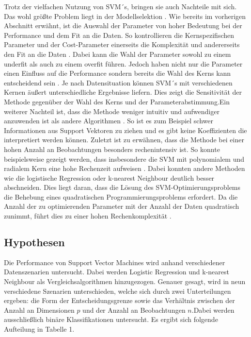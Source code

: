 \documentclass[
]{article}
\begin{document}
Trotz der vielfachen Nutzung von SVM´s, bringen sie auch Nachteile mit
sich. Das wohl größte Problem liegt in der Modellselektion
\parencite{bennettSupportVectorMachines2000}. Wie bereits im vorherigen
Abschnitt erwähnt, ist die Auswahl der Parameter von hoher Bedeutung bei
der Performance und dem Fit an die Daten. So kontrollieren die
Kernspezifischen Parameter und der Cost-Parameter einerseits die
Komplexität und andererseits den Fit an die Daten
\parencite{kuhnAppliedPredictiveModeling2013}. Dabei kann die Wahl der
Parameter sowohl zu einem underfit als auch zu einem overfit führen.
Jedoch haben nicht nur die Parameter einen Einfluss auf die Performance
sondern bereits die Wahl des Kerns kann entscheidend sein
\parencite{burgesTutorialSupportVector1998}. Je nach Datensituation
können SVM´s mit verschiedenen Kernen äußert unterschiedliche Ergebnisse
liefern. Dies zeigt die Sensitivität der Methode gegenüber der Wahl des
Kerns und der Parameterabstimmung.\newline Ein weiterer Nachteil ist,
dass die Methode weniger intuitiv und aufwendiger anzuwenden ist als
andere Algorithmen \parencite{bennettSupportVectorMachines2000}. So ist
es zum Beispiel schwer Informationen aus Support Vektoren zu ziehen und
es gibt keine Koeffizienten die interpretiert werden können.\newline
Zuletzt ist zu erwähnen, dass die Methode bei einer hohen Anzahl an
Beobachtungen besonders rechenintensiv ist. So konnte beispielsweise
gezeigt werden, dass insbesondere die SVM mit polynomialem und radialem
Kern eine hohe Rechenzeit aufweisen
\parencite{scholzComparisonClassificationMethods2021}. Dabei konnten
andere Methoden wie die logistische Regression oder k-nearest Neighbour
deutlich besser abschneiden. Dies liegt daran, dass die Lösung des
SVM-Optimierungsproblems die Behebung eines quadratischen
Programmierungsproblems erfordert. Da die Anzahl der zu optimierenden
Parameter mit der Anzahl der Daten quadratisch zunimmt, führt dies zu
einer hohen Rechenkomplexität
\parencite{kecmanSupportVectorMachines2005}.

\subsection{Hypothesen}

Die Performance von Support Vector Machines wird anhand verschiedener
Datenszenarien untersucht. Dabei werden Logistic Regression und
k-nearest Neighbour als Vergleichsalgorithmen hinzugezogen. Genauer
gesagt, wird in neun verschiedene Szenarien unterschieden, welche sich
durch zwei Unterteilungen ergeben: die Form der Entscheidungsgrenze
sowie das Verhältnis zwischen der Anzahl an Dimensionen \(p\) und der
Anzahl an Beobachtungen \(n\).Dabei werden ausschließlich binäre
Klassifikationen untersucht. Es ergibt sich folgende Aufteilung in
Tabelle 1.
\end{document}
